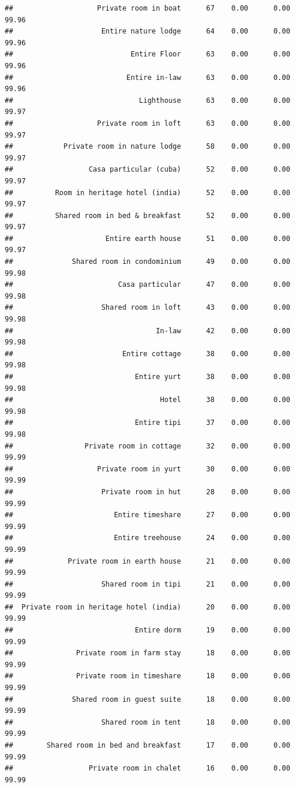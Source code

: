 \documentclass[]{article}
\begin{document}
\begin{verbatim}
##                    Private room in boat      67    0.00      0.00   99.96
##                     Entire nature lodge      64    0.00      0.00   99.96
##                            Entire Floor      63    0.00      0.00   99.96
##                           Entire in-law      63    0.00      0.00   99.96
##                              Lighthouse      63    0.00      0.00   99.97
##                    Private room in loft      63    0.00      0.00   99.97
##            Private room in nature lodge      58    0.00      0.00   99.97
##                  Casa particular (cuba)      52    0.00      0.00   99.97
##          Room in heritage hotel (india)      52    0.00      0.00   99.97
##          Shared room in bed & breakfast      52    0.00      0.00   99.97
##                      Entire earth house      51    0.00      0.00   99.97
##              Shared room in condominium      49    0.00      0.00   99.98
##                         Casa particular      47    0.00      0.00   99.98
##                     Shared room in loft      43    0.00      0.00   99.98
##                                  In-law      42    0.00      0.00   99.98
##                          Entire cottage      38    0.00      0.00   99.98
##                             Entire yurt      38    0.00      0.00   99.98
##                                   Hotel      38    0.00      0.00   99.98
##                             Entire tipi      37    0.00      0.00   99.98
##                 Private room in cottage      32    0.00      0.00   99.99
##                    Private room in yurt      30    0.00      0.00   99.99
##                     Private room in hut      28    0.00      0.00   99.99
##                        Entire timeshare      27    0.00      0.00   99.99
##                        Entire treehouse      24    0.00      0.00   99.99
##             Private room in earth house      21    0.00      0.00   99.99
##                     Shared room in tipi      21    0.00      0.00   99.99
##  Private room in heritage hotel (india)      20    0.00      0.00   99.99
##                             Entire dorm      19    0.00      0.00   99.99
##               Private room in farm stay      18    0.00      0.00   99.99
##               Private room in timeshare      18    0.00      0.00   99.99
##              Shared room in guest suite      18    0.00      0.00   99.99
##                     Shared room in tent      18    0.00      0.00   99.99
##        Shared room in bed and breakfast      17    0.00      0.00   99.99
##                  Private room in chalet      16    0.00      0.00   99.99

\end{verbatim}
\end{document}
